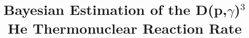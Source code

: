 \documentclass[twocolumn]{aastex63}
\begin{document}
\title{Bayesian Estimation of the D(p,$\gamma$)$^3$He Thermonuclear Reaction Rate}


\end{document}
